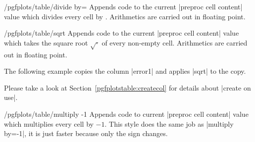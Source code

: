 \documentclass[a4paper]{ltxdoc}
\begin{document}
\begin{stylekey}{/pgfplots/table/divide by=}
    Appends code to the current |preproc cell content| value which divides
    every cell by . Arithmetics are carried out in floating
    point.
\end{stylekey}

\begin{stylekey}{/pgfplots/table/sqrt}
    Appends code to the current |preproc cell content| value which takes the
    square root $\sqrt{\cdot}$ of every non-empty cell. Arithmetics are carried
    out in floating point.

    The following example copies the column |error1| and applies |sqrt| to the
    copy.
\begin{codeexample}[]
\end{codeexample}
    Please take a look at Section~\ref{pgfplotstable:createcol} for details
    about |create on use|.
\end{stylekey}

\begin{stylekey}{/pgfplots/table/multiply -1}
    Appends code to current |preproc cell content| value which multiplies every
    cell by $-1$. This style does the same job as |multiply by=-1|, it is just
    faster because only the sign changes.
\begin{codeexample}[]


\end{codeexample}
\end{stylekey}
\end{document}
